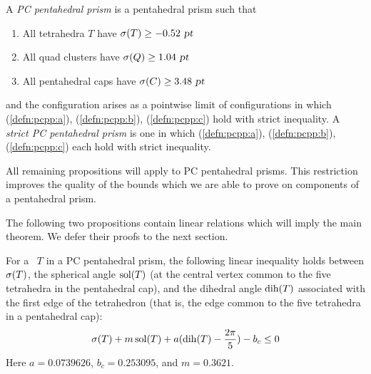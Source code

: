 %
%

\begin{defn}
\label{defn:pcpp}


A {\em PC pentahedral prism} is a pentahedral
prism such that
\begin{enumerate}
  \item All tetrahedra $T$ have $\operatorname{\sigma}(T) \ge -0.52 \text{ \sl pt}$ \label{defn:pcpp:a}
  \item All quad clusters have $\operatorname{\sigma}(Q) \ge 1.04 \text{ \sl pt}$ \label{defn:pcpp:b}
  \item All pentahedral caps have $\operatorname{\sigma}(C) \ge 3.48 \text{ \sl pt}$ \label{defn:pcpp:c}
\end{enumerate}
and the configuration arises as a pointwise limit
of configurations in which (\ref{defn:pcpp:a}), (\ref{defn:pcpp:b}), (\ref{defn:pcpp:c}) hold with
strict inequality. A  {\em strict PC pentahedral prism} is one in which
(\ref{defn:pcpp:a}), (\ref{defn:pcpp:b}), (\ref{defn:pcpp:c}) each hold with strict inequality.
\end{defn}

All remaining propositions will apply to PC pentahedral prisms.  This restriction improves the
quality of the bounds which we are able to prove on components of a pentahedral prism.

The following two propositions contain linear relations which will imply
the main theorem.
We defer their proofs to the next section.

\begin{prop}
\label{prop:qrtetbound}
For a \qrtet\ $T$ in a PC pentahedral prism, the following
linear inequality holds between $\operatorname{\sigma}(T)$, the spherical angle $\operatorname{sol}(T)$
(at the central vertex common to the five tetrahedra in the pentahedral cap),
and the dihedral
angle $\operatorname{dih}(T)$ associated with the first edge of the tetrahedron
(that is, the edge common to the  five tetrahedra in a pentahedral cap):
\[\operatorname{\sigma}(T) + m \operatorname{sol}(T) + a (\operatorname{dih}(T) - \frac{2 \pi}{5}) - b_c \le 0\]
Here $a = 0.0739626$, $b_c = 0.253095$, and $m = 0.3621$.
\end{prop}

